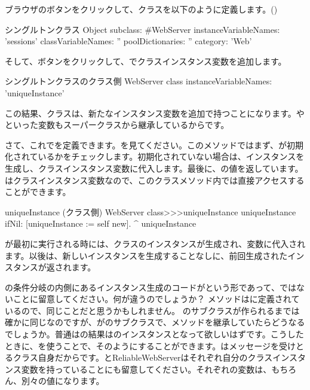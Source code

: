 \documentclass[a4paper,10pt,twoside]{book}
\begin{document}
ブラウザのボタンをクリックして、クラスを以下のように定義します。()

\begin{classdef}[singleton]{シングルトンクラス}
Object subclass: #WebServer
	instanceVariableNames: 'sessions' 	
	classVariableNames: '' 	
	poolDictionaries: '' 	
	category: 'Web'
\end{classdef}

そして、ボタンをクリックして、でクラスインスタンス変数を追加します。

\begin{classdef}[webserver]{シングルトンクラスのクラス側}
WebServer class 	
	instanceVariableNames: 'uniqueInstance'
\end{classdef}

この結果、クラスは、新たなインスタンス変数を追加で持つことになります。やといった変数もスーパークラスから継承しているからです。

さて、これでを定義できます。を見てください。このメソッドではまず、が初期化されているかをチェックします。初期化されていない場合は、インスタンスを生成し、クラスインスタンス変数に代入します。最後に、の値を返しています。はクラスインスタンス変数なので、このクラスメソッド内では直接アクセスすることができます。
    
\begin{method}[uniqueInstance]{uniqueInstance (クラス側)}
WebServer class>>>uniqueInstance
     uniqueInstance ifNil: [uniqueInstance := self new].
     ^ uniqueInstance
\end{method}

が最初に実行される時には、クラスのインスタンスが生成され、変数に代入されます。以後は、新しいインスタンスを生成することなしに、前回生成されたインスタンスが返されます。

の条件分岐の内側にあるインスタンス生成のコードがという形であって、ではないことに留意してください。何が違うのでしょうか？
メソッドはに定義されているので、同じことだと思うかもしれません。
のサブクラスが作られるまでは確かに同じなのですが、がのサブクラスで、メソッドを継承していたらどうなるでしょうか。普通はの結果はのインスタンスとなって欲しいはずです。こうしたときに、\self を使うことで、そのようにすることができます。\self はメッセージを受けとるクラス自身だからです。と{ReliableWebServer}はそれぞれ自分のクラスインスタンス変数を持っていることにも留意してください。それぞれの変数は、もちろん、別々の値になります。
\end{document}
